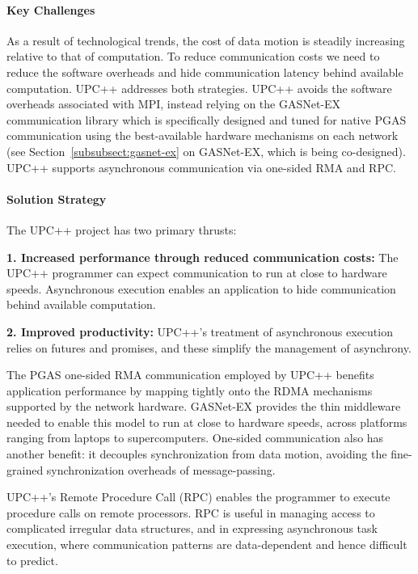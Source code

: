 \paragraph{Key  Challenges}

As a result of technological trends, the cost of data motion is steadily increasing relative to that of computation.  To reduce communication costs we need to 
reduce the software overheads and hide communication latency behind available computation. UPC++ addresses both strategies.
UPC++ avoids the software overheads associated with MPI, 
instead relying on the GASNet-EX~\cite{gasnet-lcpc18,gasnet-site}
communication library which is specifically designed and tuned
for native PGAS communication using the best-available hardware
mechanisms on each network
(see Section~\ref{subsubsect:gasnet-ex} on GASNet-EX, which is being co-designed).
UPC++ supports asynchronous communication via one-sided RMA and RPC.

\paragraph{Solution Strategy}

The UPC++ project has two primary thrusts:


\textbf{1. Increased performance through reduced communication costs:} The
UPC++ programmer can expect communication to run at close to hardware speeds.
Asynchronous execution enables an application to hide communication behind
available computation.

\textbf{2. Improved productivity:}  UPC++'s treatment of asynchronous
execution relies on futures and promises, and these simplify the management of
asynchrony.

The PGAS one-sided RMA communication employed by UPC++
benefits application  performance by mapping tightly onto the RDMA mechanisms
supported by the network hardware. GASNet-EX provides the
thin middleware
needed to enable this model to run at close to hardware speeds, across platforms ranging from laptops to supercomputers.
One-sided communication also has another benefit:
it decouples synchronization from data motion,
avoiding the fine-grained synchronization overheads of message-passing.

UPC++'s Remote Procedure Call (RPC)
enables the programmer
to execute procedure calls on remote processors.
RPC is useful in managing access to complicated irregular data structures,
and in expressing asynchronous task execution, where communication patterns
are data-dependent and hence difficult to predict.

